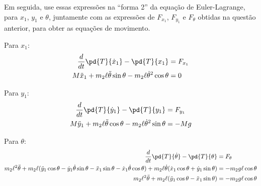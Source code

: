 \begin{question}
\begin{solution}
      Em seguida, use essas expressões na ``forma 2'' da equação de Euler-Lagrange, para $x_1$, $y_1$ e $\theta$, juntamente com as expressões de $F_{x_1}$, $F_{y_1}$ e $F_{\theta}$ obtidas na questão anterior, para obter as equações de movimento.

      Para $x_1$:
      \begin{align*}
        \frac{d}{dt}\pd{T}{\dot x_1} - \pd{T}{x_1} &= F_{x_1}\\
        M\ddot x_1 + m_2\ell\ddot\theta\sin\theta - m_2\ell\dot\theta^2\cos\theta &= 0
      \end{align*}

      Para $y_1$:
      \begin{align*}
        \frac{d}{dt}\pd{T}{\dot y_1} - \pd{T}{y_1} &= F_{y_1}\\
        M\ddot y_1 + m_2\ell\ddot\theta\cos\theta - m_2\ell\dot\theta^2\sin\theta &= -Mg
      \end{align*}

      Para $\theta$:
      \begin{align*}
        \frac{d}{dt}\pd{T}{\dot \theta} - \pd{T}{\theta} &= F_{\theta} \\
        m_2\ell^2\ddot\theta + m_2\ell(\ddot y_1 \cos\theta - \dot y_1\dot \theta \sin\theta - \ddot x_1\sin\theta - \dot x_1\dot \theta \cos\theta) + m_2\ell \dot\theta (\dot x_1 \cos\theta + \dot y_1 \sin\theta) &= -m_2g\ell\cos\theta \\
        m_2\ell^2\ddot\theta + m_2\ell(\ddot y_1 \cos\theta - \ddot x_1\sin\theta) &= -m_2g\ell\cos\theta
      \end{align*}
    \end{solution}
\end{question}